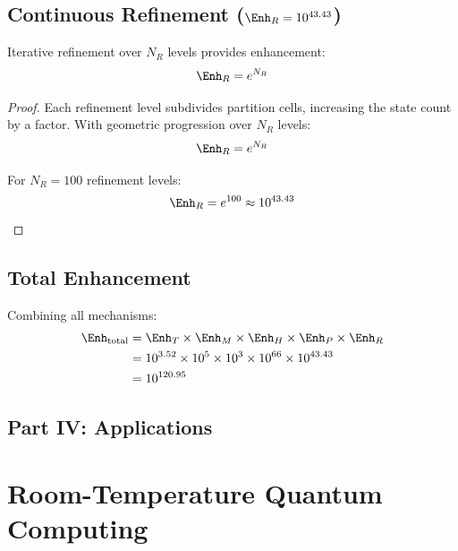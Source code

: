 \subsection{Continuous Refinement ($\Enh_R = 10^{43.43}$)}

\begin{theorem}
\label{thm:refinement}
Iterative refinement over $N_R$ levels provides enhancement:
\begin{equation}
\Enh_R = e^{N_R}
\end{equation}
\end{theorem}

\begin{proof}
Each refinement level subdivides partition cells, increasing the state count by a factor. With geometric progression over $N_R$ levels:
\begin{equation}
\Enh_R = e^{N_R}
\end{equation}

For $N_R = 100$ refinement levels:
\begin{equation}
\Enh_R = e^{100} \approx 10^{43.43}
\end{equation}
\end{proof}

\subsection{Total Enhancement}

Combining all mechanisms:
\begin{align}
\Enh_{\text{total}} &= \Enh_T \times \Enh_M \times \Enh_H \times \Enh_P \times \Enh_R \\
&= 10^{3.52} \times 10^5 \times 10^3 \times 10^{66} \times 10^{43.43} \\
&= 10^{120.95}
\label{eq:total_enhancement_value}
\end{align}


\subsection*{Part IV: Applications}

\section{Room-Temperature Quantum Computing}

